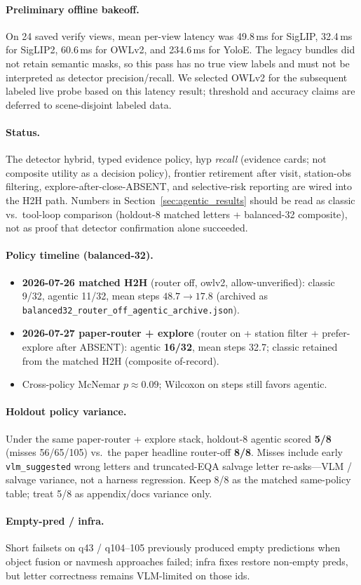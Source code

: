 \paragraph{Preliminary offline bakeoff.}
On 24 saved verify views, mean per-view latency was 49.8\,ms for SigLIP, 32.4\,ms for SigLIP2, 60.6\,ms for OWLv2, and 234.6\,ms for YoloE.
The legacy bundles did not retain semantic masks, so this pass has no true view labels and must not be interpreted as detector precision/recall.
We selected OWLv2 for the subsequent labeled live probe based on this latency result; threshold and accuracy claims are deferred to scene-disjoint labeled data.

\paragraph{Status.}
The detector hybrid, typed evidence policy, hyp \emph{recall} (evidence cards; not composite utility as a decision policy), frontier retirement after visit, station-obs filtering, explore-after-close-ABSENT, and selective-risk reporting are wired into the H2H path.
Numbers in Section~\ref{sec:agentic_results} should be read as classic vs.\ tool-loop comparison (holdout-8 matched letters + balanced-32 composite), not as proof that detector confirmation alone succeeded.

\paragraph{Policy timeline (balanced-32).}
\begin{itemize}
  \item \textbf{2026-07-26 matched H2H} (router off, owlv2, allow-unverified): classic 9/32, agentic 11/32, mean steps $48.7\rightarrow 17.8$ (archived as \texttt{balanced32\_router\_off\_agentic\_archive.json}).
  \item \textbf{2026-07-27 paper-router + explore} (router on + station filter + prefer-explore after ABSENT): agentic \textbf{16/32}, mean steps 32.7; classic retained from the matched H2H (composite of-record).
  \item Cross-policy McNemar $p{\approx}0.09$; Wilcoxon on steps still favors agentic.
\end{itemize}

\paragraph{Holdout policy variance.}
Under the same paper-router + explore stack, holdout-8 agentic scored \textbf{5/8} (misses 56/65/105) vs.\ the paper headline router-off \textbf{8/8}.
Misses include early \texttt{vlm\_suggested} wrong letters and truncated-EQA salvage letter re-asks---VLM / salvage variance, not a harness regression.
Keep 8/8 as the matched same-policy table; treat 5/8 as appendix/docs variance only.

\paragraph{Empty-pred / infra.}
Short failsets on q43 / q104--105 previously produced empty predictions when object fusion or navmesh approaches failed; infra fixes restore non-empty preds, but letter correctness remains VLM-limited on those ids.
